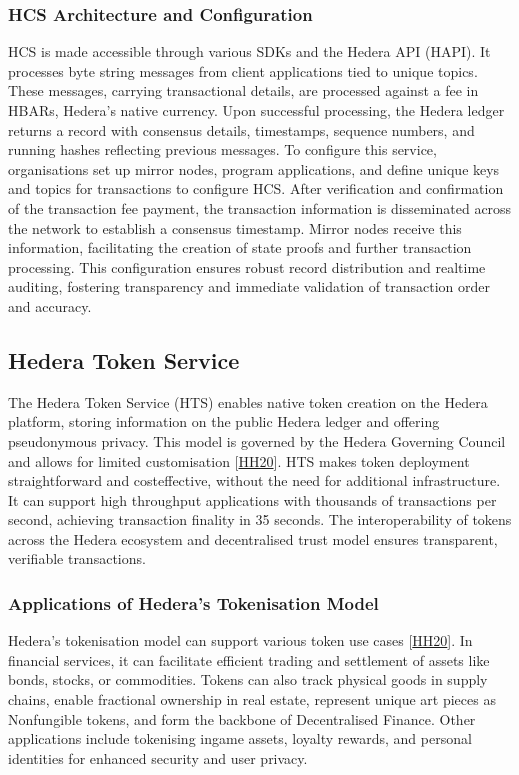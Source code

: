 \documentclass[letterpaper,10pt,english]{jupyterBook}
\begin{document}
\subsubsection{HCS Architecture and Configuration}
\label{\detokenize{HED/hed:hcs-architecture-and-configuration}}
\sphinxAtStartPar
HCS is made accessible through various SDKs and the Hedera API (HAPI). It processes byte string messages from client applications tied to unique topics. These messages, carrying transactional details, are processed against a fee in HBARs, Hedera’s native currency. Upon successful processing, the Hedera ledger returns a record with consensus details, timestamps, sequence numbers, and running hashes reflecting previous messages. To configure this service, organisations set up mirror nodes, program applications, and define unique keys and topics for transactions to configure HCS. After verification and confirmation of the transaction fee payment, the transaction information is disseminated across the network to establish a consensus timestamp. Mirror nodes receive this information, facilitating the creation of state proofs and further transaction processing. This configuration ensures robust record distribution and real\sphinxhyphen{}time auditing, fostering transparency and immediate validation of transaction order and accuracy.


\subsection{Hedera Token Service}
\label{\detokenize{HED/hed:hedera-token-service}}
\sphinxAtStartPar
The Hedera Token Service (HTS) enables native token creation on the Hedera platform, storing information on the public Hedera ledger and offering pseudonymous privacy. This model is governed by the Hedera Governing Council and allows for limited customisation {[}\hyperlink{cite.HED/hed:id124}{HH20}{]}. HTS makes token deployment straightforward and cost\sphinxhyphen{}effective, without the need for additional infrastructure. It can support high throughput applications with thousands of transactions per second, achieving transaction finality in 3\sphinxhyphen{}5 seconds. The interoperability of tokens across the Hedera ecosystem and decentralised trust model ensures transparent, verifiable transactions.


\subsubsection{Applications of Hedera’s Tokenisation Model}
\label{\detokenize{HED/hed:applications-of-hedera-s-tokenisation-model}}
\sphinxAtStartPar
Hedera’s tokenisation model can support various token use cases {[}\hyperlink{cite.HED/hed:id124}{HH20}{]}. In financial services, it can facilitate efficient trading and settlement of assets like bonds, stocks, or commodities. Tokens can also track physical goods in supply chains, enable fractional ownership in real estate, represent unique art pieces as Non\sphinxhyphen{}fungible tokens, and form the backbone of Decentralised Finance. Other applications include tokenising in\sphinxhyphen{}game assets, loyalty rewards, and personal identities for enhanced security and user privacy.
\end{document}
